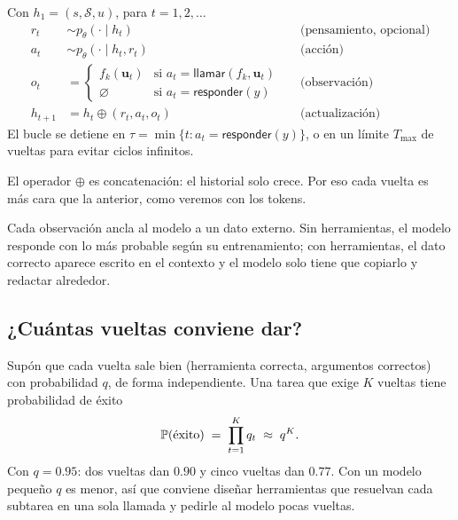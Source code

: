 \documentclass[11pt,letterpaper,oneside]{report}
\begin{document}
\begin{definicion}
Con $h_1=(s,\mathcal{S},u)$, para $t=1,2,\dots$
\begin{align}
r_t &\sim p_\theta(\cdot \mid h_t) && \text{(pensamiento, opcional)} \label{eq:react1}\\
a_t &\sim p_\theta(\cdot \mid h_t, r_t) && \text{(acción)} \label{eq:react2}\\
o_t &= \begin{cases} f_k(\mathbf{u}_t) & \text{si } a_t=\textsf{llamar}(f_k,\mathbf{u}_t)\\ \varnothing & \text{si } a_t=\textsf{responder}(y) \end{cases} && \text{(observación)} \label{eq:react3}\\
h_{t+1} &= h_t \oplus (r_t, a_t, o_t) && \text{(actualización)} \label{eq:react4}
\end{align}
El bucle se detiene en $\tau=\min\{t : a_t=\textsf{responder}(y)\}$, o en un límite $T_{\max}$ de vueltas para evitar ciclos infinitos.
\end{definicion}

El operador $\oplus$ es concatenación: el historial solo crece. Por eso cada vuelta es más cara que la anterior, como veremos con los tokens.

\begin{intuicion}
Cada observación ancla al modelo a un dato externo. Sin herramientas, el modelo responde con lo más probable según su entrenamiento; con herramientas, el dato correcto aparece escrito en el contexto y el modelo solo tiene que copiarlo y redactar alrededor.
\end{intuicion}

\subsection{¿Cuántas vueltas conviene dar?}

Supón que cada vuelta sale bien (herramienta correcta, argumentos correctos) con probabilidad $q$, de forma independiente. Una tarea que exige $K$ vueltas tiene probabilidad de éxito
\begin{equation}
\mathbb{P}(\text{éxito}) \;=\; \prod_{t=1}^{K} q_t \;\approx\; q^{K}.
\label{eq:exito}
\end{equation}
Con $q=0.95$: dos vueltas dan $0.90$ y cinco vueltas dan $0.77$. Con un modelo pequeño $q$ es menor, así que conviene diseñar herramientas que resuelvan cada subtarea en una sola llamada y pedirle al modelo pocas vueltas.
\end{document}
